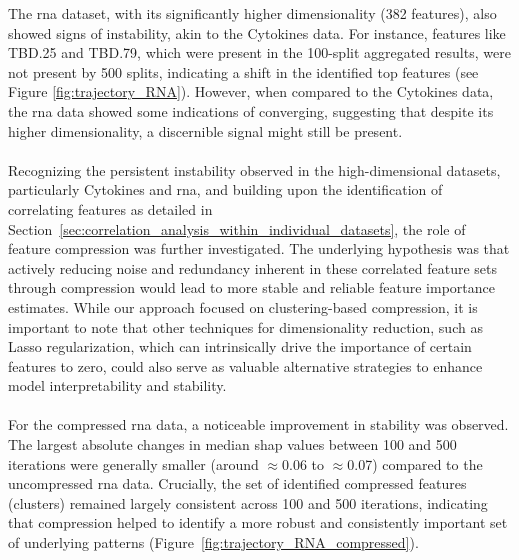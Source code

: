 \documentclass[12pt,a4paper]{report}
\begin{document}
\noindent
The \acrshort{rna} dataset, with its significantly higher dimensionality (382 features), also showed signs of instability, akin to the Cytokines data. For instance, features like TBD.25 and TBD.79, which were present in the 100-split aggregated results, were not present by 500 splits, indicating a shift in the identified top features (see Figure \ref{fig:trajectory_RNA}). However, when compared to the Cytokines data, the \acrshort{rna} data showed some indications of converging, suggesting that despite its higher dimensionality, a discernible signal might still be present.\\
\\
Recognizing the persistent instability observed in the high-dimensional datasets, particularly Cytokines and \acrshort{rna}, and building upon the identification of correlating features as detailed in Section~\ref{sec:correlation_analysis_within_individual_datasets}, the role of feature compression was further investigated. The underlying hypothesis was that actively reducing noise and redundancy inherent in these correlated feature sets through compression would lead to more stable and reliable feature importance estimates. While our approach focused on clustering-based compression, it is important to note that other techniques for dimensionality reduction, such as Lasso regularization, which can intrinsically drive the importance of certain features to zero, could also serve as valuable alternative strategies to enhance model interpretability and stability.\\
\\
For the compressed \acrshort{rna} data, a noticeable improvement in stability was observed. The largest absolute changes in median \gls{shap} values between 100 and 500 iterations were generally smaller (around $\approx$0.06 to $\approx$0.07) compared to the uncompressed \acrshort{rna} data. Crucially, the set of identified compressed features (clusters) remained largely consistent across 100 and 500 iterations, indicating that compression helped to identify a more robust and consistently important set of underlying patterns (Figure~\ref{fig:trajectory_RNA_compressed}).\\
\\
\end{document}
